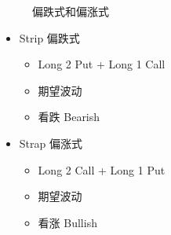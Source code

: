 \documentclass[a4paper,6pt,twoside,openany]{article}
\begin{document}
\begin{itemize}
\begin{figure}[!htbp]
    \caption{偏跌式和偏涨式}
  \end{figure}
  \begin{itemize}
  \item Strip 偏跌式
    \begin{itemize}
    \item Long 2 Put + Long 1 Call
    \item 期望波动
     \item 看跌 Bearish
    \end{itemize}
  \item Strap 偏涨式
    \begin{itemize}
    \item Long 2 Call + Long 1 Put
    \item 期望波动
     \item 看涨 Bullish
    \end{itemize}
  \end{itemize}
\end{itemize}
  
\end{document}

